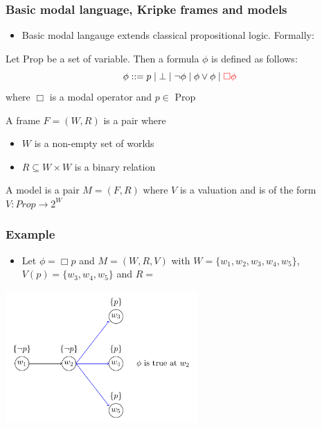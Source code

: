 \documentclass[hyperref={pdfpagelabels=false},t,10pt]{beamer}
\begin{document}
\begin{frame}
  \frametitle{Basic modal language, Kripke frames and models}
  \begin{itemize}
    \item Basic modal langauge extends classical propositional logic. Formally:
  \end{itemize}
    
    \begin{definition}
      Let Prop be a set of variable. Then a formula $\phi$ is defined as follows:
          $$\phi ::= p \mid \bot \mid \neg \phi \mid \phi \lor \phi \mid \textcolor{red}{\Box \phi}$$
           where $\Box$ is a modal operator and $p \in$ Prop  
    \end{definition}
     \pause

    \begin{definition}
    A frame $F = (W,R)$ is a pair where   
    \begin{itemize}
      \item $W$ is a non-empty set of worlds
      \item $R \subseteq W \times W $ is a binary relation
    \end{itemize}

    A model is a pair $M = (F,R)$ where $V$ is a valuation and is of the form $V : Prop \rightarrow 2^W$


    \end{definition}

\end{frame}

\begin{frame}
  \frametitle{Example}
  \begin{itemize}
    \item Let $\phi = \Box p$ and $M = (W,R,V)$ with $W = \{w_1,w_2,w_3,w_4,w_5\}$, $V(p) = \{w_3,w_4,w_5\}$ and $R = $
  \end{itemize}
  \centering
  \includegraphics[width=0.55\textwidth]{Example1.pdf}
\end{frame}
\end{document}
